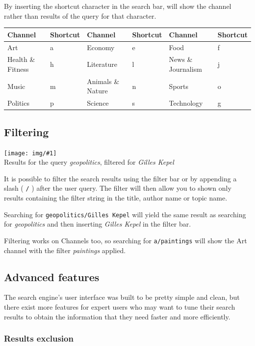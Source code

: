 \documentclass[12pt]{exam}
\newcommand{\pic}[2]{{
\begin{center}
\texttt{[image: img/\#1]} \\
{#2}
\end{center}
}}
\begin{document}
By inserting the shortcut character in the search bar, will show the channel
rather than results of the query for that character.

\begin{center}
\begin{tabular}{ll|ll|ll}
Channel & Shortcut & Channel & Shortcut & Channel & Shortcut \\\hline
Art               & a & Economy           & e & Food               & f \\
Health \& Fitness & h & Literature        & l & News \& Journalism & j \\
Music             & m & Animals \& Nature & n & Sports             & o \\
Politics          & p & Science           & s & Technology         & g \\
\end{tabular}
\end{center}

\subsection{Filtering}

\pic{se_filter}{
Results for the query \textit{geopolitics}, filtered for \textit{Gilles Kepel}
}

It is possible to filter the search results using the filter bar or by
appending a slash ( \texttt{/} ) after the user query. The filter will
then allow you to shown only results containing the filter string in the
title, author name or topic name.

Searching for \texttt{geopolitics/Gilles Kepel} will yield the same result as
searching for \textit{geopolitics} and then inserting \textit{Gilles Kepel} in
the filter bar.

Filtering works on Channels too, so searching for \texttt{a/paintings} will
show the Art channel with the filter \textit{paintings} applied.

\subsection{Advanced features}

The search engine's user interface was built to be pretty simple and clean,
but there exist more features for expert users who may want to tune their
search results to obtain the information that they need faster and more
efficiently.

\subsubsection{Results exclusion}
\end{document}
